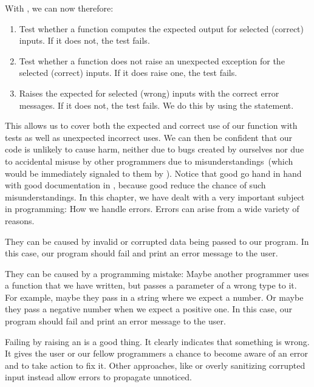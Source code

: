 With \pytest, we can now therefore:%
%
\begin{enumerate}%
%
\item Test whether a function computes the expected output for selected (correct) inputs. %
If it does not, the test fails.%
%
\item Test whether a function does not raise an unexpected exception for the selected (correct) inputs. %
If it does raise one, the test fails.%
%
\item Raises the expected  for selected (wrong) inputs with the correct error messages. %
If it does not, the test fails. %
We do this by using the  statement.%
%
\end{enumerate}%
%
This allows us to cover both the expected and correct use of our function with tests as well as unexpected incorrect uses.
We can then be confident that our code is unlikely to cause harm, neither due to bugs created by ourselves nor due to accidental misuse by other programmers due to misunderstandings~(which would be immediately signaled to them by ).
Notice that good  go hand in hand with good documentation in , because good  reduce the chance of such misunderstandings.%
%
%
%
\FloatBarrier%
\endhsection%
%
%
In this chapter, we have dealt with a very important subject in programming:
How we handle errors.
Errors can arise from a wide variety of reasons.

They can be caused by invalid or corrupted data being passed to our program.
In this case, our program should fail and print an error message to the user.

They can be caused by a programming mistake:
Maybe another programmer uses a function that we have written, but passes a parameter of a wrong type to it.
For example, maybe they pass in a string where we expect a number.
Or maybe they pass a negative number when we expect a positive one.
In this case, our program should fail and print an error message to the user.

Failing by raising an  is a good thing.
It clearly indicates that something is wrong.
It gives the user or our fellow programmers a chance to become aware of an error and to take action to fix it.
Other approaches, like  or overly sanitizing corrupted input instead allow errors to propagate unnoticed.

